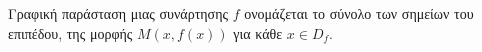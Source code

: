 Γραφική παράσταση μιας συνάρτησης $ f $ ονομάζεται το σύνολο των σημείων του επιπέδου, της μορφής $ M(x,f(x)) $ για κάθε $ x\in D_f $.
